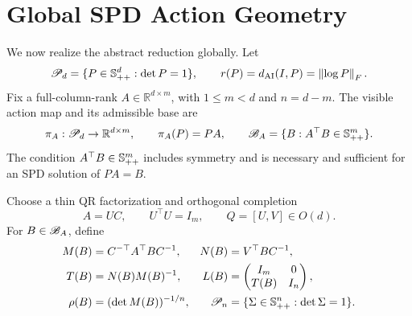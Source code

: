 \section{Global SPD Action Geometry}
\label{sec:action-bundle}

We now realize the abstract reduction globally.  Let
\[
  \mathscr P_d=\{P\in\mathbb{S}_{++}^d:\det P=1\},
  \qquad
  r(P)=d_{\mathrm{AI}}(I,P)=\left\lVert \log P\right\rVert_F.
\]
Fix a full-column-rank \(A\in\mathbb R^{d\times m}\), with \(1\le m<d\)
and \(n=d-m\).  The visible action map and its admissible base are
\begin{equation}
  \pi_A:\mathscr P_d\to\mathbb R^{d\times m},
  \qquad
  \pi_A(P)=PA,
  \qquad
  \mathscr B_A=\{B:A^\top B\in\mathbb{S}_{++}^m\}.
  \label{eq:action-map-base}
\end{equation}
The condition \(A^\top B\in\mathbb{S}_{++}^m\) includes symmetry and is necessary and
sufficient for an SPD solution of \(PA=B\).

Choose a thin QR factorization and orthogonal completion
\[
  A=UC,
  \qquad U^\top U=I_m,
  \qquad Q=[U,V]\in O(d).
\]
For \(B\in\mathscr B_A\), define
\begin{align}
  M(B)&=C^{-\top}A^\top BC^{-1},
  &N(B)&=V^\top BC^{-1},
  \label{eq:action-coordinates}\\
  T(B)&=N(B)M(B)^{-1},
  &L(B)&=\begin{pmatrix}I_m&0\\T(B)&I_n\end{pmatrix},
  \label{eq:action-triangular}\\
  \rho(B)&=(\det M(B))^{-1/n},
  &\mathscr P_n&=\{\Sigma\in\mathbb{S}_{++}^n:\det\Sigma=1\}.
  \label{eq:action-fiber-coordinates}
\end{align}

